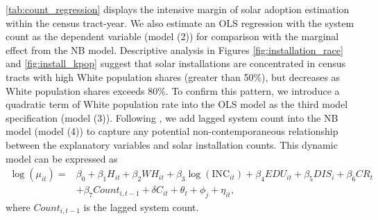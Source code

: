 \documentclass[11pt,twoside,letterpaper]{article}
\begin{document}
\autoref{tab:count_regression} displays the intensive margin of solar adoption estimation within the census tract-year. We also estimate an OLS regression with the system count as the dependent variable (model (2)) for comparison with the marginal effect from the NB model. %
Descriptive analysis in Figures \ref{fig:installation_race} and \ref{fig:install_kpop} suggest that solar installations are concentrated in census tracts with high White population shares (greater than 50\%), but decreases as White population shares exceeds 80\%. To confirm this pattern, we introduce a quadratic term of White population rate into the OLS model as the third model specification (model (3)). Following \textcite{ros_residential_2023}, we add lagged system count into the NB model (model (4)) to capture any potential non-contemporaneous relationship between the explanatory variables and solar installation counts. This dynamic model can be expressed as 
\begin{equation}
\label{reg_2.2}
\begin{aligned}
\log(\mu_{it}) = &\beta_{0} + \beta_{1}H_{it} + \beta_{2}WH_{it} + \beta_{3}\log(\text{INC}_{it}) + \beta_{4}EDU_{it} + \beta_{5}DIS_{i} + \beta_{6}CR_{t}\\ 
&+ \beta_7Count_{i,t-1}
 + \delta C_{it} + \theta_{t} + \phi_{j} + \eta_{it},
\end{aligned}
\end{equation}
where $Count_{i,t-1}$ is the lagged system count.
\end{document}
